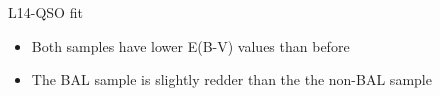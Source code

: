 \documentclass[landscape,9pt]{beamer}
\begin{document}
\begin{frame}[label=L14_fits]
\begin{columns}
\begin{column}{0.45\textwidth}
		\end{column}
	\end{columns}
	\begin{block}{L14-QSO fit}
		\begin{itemize}
			\item{Both samples have lower E(B-V) values than before}
			\item{The BAL sample is slightly redder than the the non-BAL sample}
		\end{itemize}
	\end{block}
\end{frame}

\end{document}
